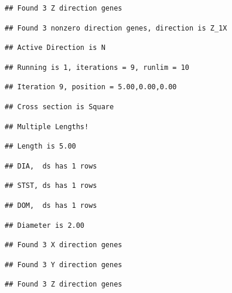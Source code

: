 \documentclass[]{article}
\begin{document}
\begin{verbatim}
## Found 3 Z direction genes
\end{verbatim}

\begin{verbatim}
## Found 3 nonzero direction genes, direction is Z_1X
\end{verbatim}

\begin{verbatim}
## Active Direction is N
\end{verbatim}

\begin{verbatim}
## Running is 1, iterations = 9, runlim = 10
\end{verbatim}

\begin{verbatim}
## Iteration 9, position = 5.00,0.00,0.00
\end{verbatim}

\begin{verbatim}
## Cross section is Square
\end{verbatim}

\begin{verbatim}
## Multiple Lengths!
\end{verbatim}

\begin{verbatim}
## Length is 5.00
\end{verbatim}

\begin{verbatim}
## DIA,  ds has 1 rows
\end{verbatim}

\begin{verbatim}
## STST, ds has 1 rows
\end{verbatim}

\begin{verbatim}
## DOM,  ds has 1 rows
\end{verbatim}

\begin{verbatim}
## Diameter is 2.00
\end{verbatim}

\begin{verbatim}
## Found 3 X direction genes
\end{verbatim}

\begin{verbatim}
## Found 3 Y direction genes
\end{verbatim}

\begin{verbatim}
## Found 3 Z direction genes
\end{verbatim}
\end{document}
